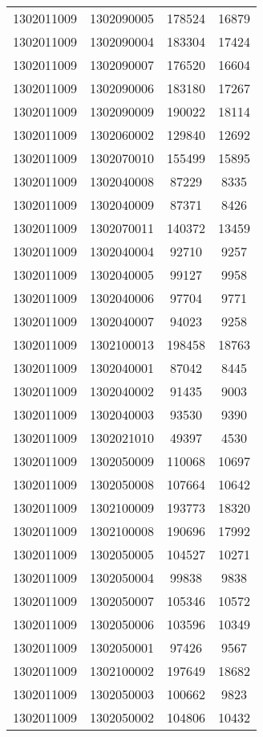 \begin{longtable}[h]{llcc}
		1302011009 & 1302090005 & 178524 & 16879\\
		1302011009 & 1302090004 & 183304 & 17424\\
		1302011009 & 1302090007 & 176520 & 16604\\
		1302011009 & 1302090006 & 183180 & 17267\\
		1302011009 & 1302090009 & 190022 & 18114\\
		1302011009 & 1302060002 & 129840 & 12692\\
		1302011009 & 1302070010 & 155499 & 15895\\
		1302011009 & 1302040008 & 87229 & 8335\\
		1302011009 & 1302040009 & 87371 & 8426\\
		1302011009 & 1302070011 & 140372 & 13459\\
		1302011009 & 1302040004 & 92710 & 9257\\
		1302011009 & 1302040005 & 99127 & 9958\\
		1302011009 & 1302040006 & 97704 & 9771\\
		1302011009 & 1302040007 & 94023 & 9258\\
		1302011009 & 1302100013 & 198458 & 18763\\
		1302011009 & 1302040001 & 87042 & 8445\\
		1302011009 & 1302040002 & 91435 & 9003\\
		1302011009 & 1302040003 & 93530 & 9390\\
		1302011009 & 1302021010 & 49397 & 4530\\
		1302011009 & 1302050009 & 110068 & 10697\\
		1302011009 & 1302050008 & 107664 & 10642\\
		1302011009 & 1302100009 & 193773 & 18320\\
		1302011009 & 1302100008 & 190696 & 17992\\
		1302011009 & 1302050005 & 104527 & 10271\\
		1302011009 & 1302050004 & 99838 & 9838\\
		1302011009 & 1302050007 & 105346 & 10572\\
		1302011009 & 1302050006 & 103596 & 10349\\
		1302011009 & 1302050001 & 97426 & 9567\\
		1302011009 & 1302100002 & 197649 & 18682\\
		1302011009 & 1302050003 & 100662 & 9823\\
		1302011009 & 1302050002 & 104806 & 10432\\

\end{longtable}
